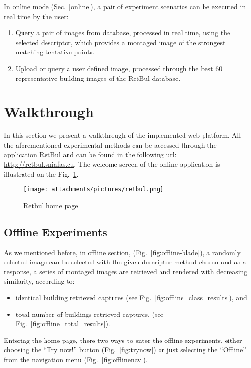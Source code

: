 In online mode (Sec.~\ref{online}), a pair of experiment scenarios can be executed in real time by the user:
 \begin{enumerate}
  \item Query a pair of images from database, processed in real time, using the selected descriptor,  which provides a montaged image of the strongest matching tentative points.
  \item Upload or query a user defined image, processed through the best 60 representative building images of the RetBul database.
 \end{enumerate}


\section{Walkthrough}\label{walkthrough}

In this section we present a walkthrough of the implemented web platform. All the aforementioned experimental methods can be accessed through the application RetBul and can be found in the following url: \url{http://retbul.sniafas.eu}.
The welcome screen of the online application is illustrated on the Fig.~\ref{fig:retbul}.
  
\begin{figure}[h]
  \centering
  \texttt{[image: attachments/pictures/retbul.png]}
  \caption{Retbul home page}
  \label{fig:retbul}
\end{figure} 

\newpage

\subsection{Offline Experiments}\label{offline}


As we mentioned before, in offline section,  (Fig.~\ref{fig:offline-blade}), a randomly selected image can be selected with the given descriptor method chosen and as a response, a series of montaged images are retrieved and rendered with decreasing similarity, according to:
\begin{itemize}
    \item identical building retrieved captures (see Fig.~\ref{fig:offline_class_results}), and
    \item total number of buildings retrieved captures. (see Fig.~\ref{fig:offline_total_results}).
\end{itemize}

Entering the home page, there two ways to enter the offline experiments, either choosing the ``Try now!'' button (Fig.~\ref{fig:trynow}) or just selecting the ``Offline'' from the navigation menu (Fig.~\ref{fig:offlinenav}).




